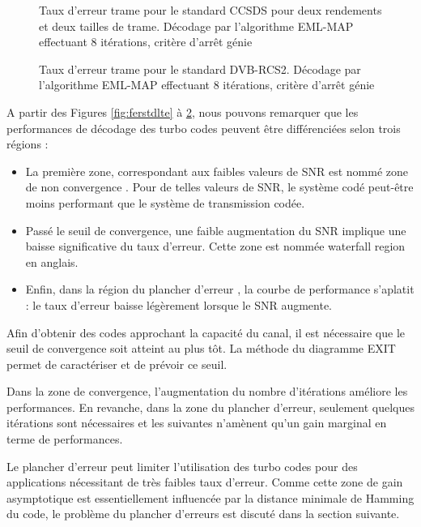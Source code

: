 \begin{figure}[h]
\centering
				
		\caption{Taux d'erreur trame pour le standard CCSDS pour deux rendements et deux tailles de trame. 
		Décodage par l'algorithme EML-MAP effectuant 8 itérations, critère d’arrêt génie}
		\label{fig:ferstdCCSDS}
\end{figure}

\begin{figure}[h]
\centering
				
		\caption{Taux d'erreur trame pour le standard DVB-RCS2. Décodage par l'algorithme EML-MAP effectuant 
		8 itérations, critère d’arrêt génie}
		\label{fig:ferstdDVB2}
\end{figure}

\clearpage
A partir des Figures \ref{fig:ferstdlte} à \ref{fig:ferstdDVB2}, nous pouvons remarquer que les performances de décodage 
des turbo codes peuvent être différenciées selon trois régions :
\begin{itemize}
	\item La première zone, correspondant aux faibles valeurs de SNR est nommé \og zone de non convergence \fg. Pour de 
	telles valeurs de SNR, le système codé peut-être moins performant que le système de transmission codée.
	\item Passé le seuil de convergence, une faible augmentation du SNR implique une baisse significative du taux d'erreur. 
	Cette zone est nommée \og waterfall region \fg  en anglais.
	\item Enfin, dans la région du \og plancher d'erreur \fg, la courbe de performance s’aplatit : le taux d'erreur baisse 
	légèrement lorsque le SNR augmente.
\end{itemize}

Afin d'obtenir des codes approchant la capacité du canal, il est nécessaire que le seuil de convergence soit atteint au 
plus tôt. La méthode du diagramme EXIT \cite{exitchart} permet de caractériser et de prévoir ce seuil. 

Dans la zone de convergence, l'augmentation du nombre d'itérations améliore les performances. En revanche, dans la zone 
du plancher d'erreur, seulement quelques itérations sont nécessaires et les suivantes n'amènent qu'un gain marginal en 
terme de performances.

Le plancher d'erreur peut limiter l'utilisation des turbo codes pour des applications nécessitant de très faibles taux 
d'erreur. Comme cette zone de gain asymptotique est essentiellement influencée par la distance minimale de Hamming du 
code, le problème du plancher d'erreurs est discuté dans la section suivante.

